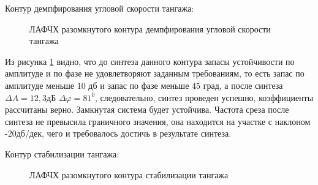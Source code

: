 \begin{center}
    Контур демпфирования угловой скорости тангажа:
\end{center}

\begin{figure}[H]
    \caption{ЛАФЧХ разомкнутого контура демпфирования угловой скорости тангажа}
    \label{fig:Угловая скорость тангажа раз qKR}
\end{figure}

Из рисунка \ref{fig:Угловая скорость тангажа раз qKR} видно, что до синтеза данного контура запасы устойчивости по амплитуде и по фазе не удовлетворяют заданным требованиям, то есть запас по амплитуде меньше 10 дб и запас по фазе меньше 45 град, а после синтеза $\Delta A = 12,3 $дБ $\Delta \varphi = 81^0$, следовательно, синтез проведен успешно, коэффициенты рассчитаны верно. Замкнутая система будет устойчива. Частота среза после синтеза не превысила граничного значения, она находится на участке с наклоном -20дб/дек, чего и требовалось достичь в результате синтеза.  

\begin{center}
    Контур стабилизации тангажа:
\end{center}

\begin{figure}[H]
    \caption{ЛАФЧХ разомкнутого контура стабилизации тангажа}
    \label{fig:Тангаж раз qKR}
\end{figure}

